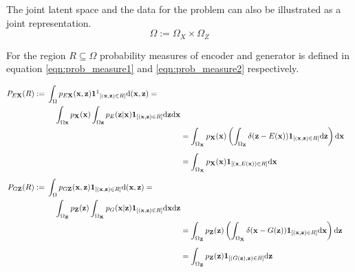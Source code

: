 The joint latent space and the data for the problem can also be illustrated as a joint
representation.
$$
\Omega := \Omega_{X} \times \Omega_{Z}
$$

 For the region $R \subseteq \Omega$ probability
 measures\cite{RePEc:eee:csdana:v:20:y:1995:i:6:p:703-702} of encoder and generator is defined in
 equation \ref{eqn:prob_measure1} and \ref{eqn:prob_measure2} respectively.\cite{Donahue2017AdversarialFL}

 \begin{align}
    \begin{split}\label{eqn:prob_measure1}
    P_{E \mathbf{X}}(R)  :={}&\int_{\Omega} p_{E \mathbf{X}}(\mathbf{x}, \mathbf{z})
    \mathbf{1\footnotemark}_{[(\mathbf{x}, \mathbf{z}) \in R]} \mathrm{d}(\mathbf{x}, \mathbf{z})= \\ 
    & \quad \int_{\Omega \mathbf{x}} p_{\mathbf{X}}(\mathbf{x}) \int_{\Omega \mathbf{z}} p_{E}(\mathbf{z} | \mathbf{x})
    \mathbf{1}_{[(\mathbf{x}, \mathbf{z}) \in R]} \mathrm{d} \mathbf{z} \mathrm{d} \mathbf{x}       
    \end{split}\\
    {}&=\int_{\Omega_{\mathbf{X}}} p_{\mathbf{X}}(\mathbf{x})\left(\int_{\Omega_{\mathbf{Z}}} \delta(\mathbf{z}-E(\mathbf{x})) \mathbf{1}_{[(\mathbf{x}, \mathbf{z}) \in R]} \mathrm{d} \mathbf{z}\right) \mathrm{d} \mathbf{x} \\[5pt]
    {}& =\int_{\Omega_{\mathbf{X}}} p_{\mathbf{X}}(\mathbf{x}) \mathbf{1}_{[(\mathbf{x}, E(\mathbf{x})) \in R]} \mathrm{d} \mathbf{x} \\[5pt]
    \begin{split}\label{eqn:prob_measure2}
    P_{G \mathbf{Z}}(R) :={}&\int_{\Omega} p_{G \mathbf{Z}}(\mathbf{x}, \mathbf{z}) 
    \mathbf{1}_{[(\mathbf{x},\mathbf{z}) \in R]} \mathrm{d}(\mathbf{x}, \mathbf{z})= \\ 
    & \quad \int_{\Omega_{\mathbf{Z}}} p_{\mathbf{Z}}(\mathbf{z}) \int_{\Omega_{\mathbf{X}}} p_{G}(\mathbf{x} | \mathbf{z})
    \mathbf{1}_{[(\mathbf{x}, \mathbf{z}) \in R]} \mathrm{d} \mathbf{x} \mathrm{d} \mathbf{z} 
    \end{split}\\
    {}&=\int_{\Omega_{\mathbf{Z}}} p_{\mathbf{Z}}(\mathbf{z})\left(\int_{\Omega_{\mathbf{X}}} \delta(\mathbf{x}-G(\mathbf{z})) \mathbf{1}_{[(\mathbf{x}, \mathbf{z}) \in R]} \mathrm{d} \mathbf{x}\right) \mathrm{d} \mathbf{z} \\[5pt]
    {}& =\int_{\Omega_{\mathbf{Z}}} p_{\mathbf{Z}}(\mathbf{z}) \mathbf{1}_{[(G(\mathbf{z}), \mathbf{z}) \in R]} \mathrm{d} \mathbf{z}
\end{align}        

